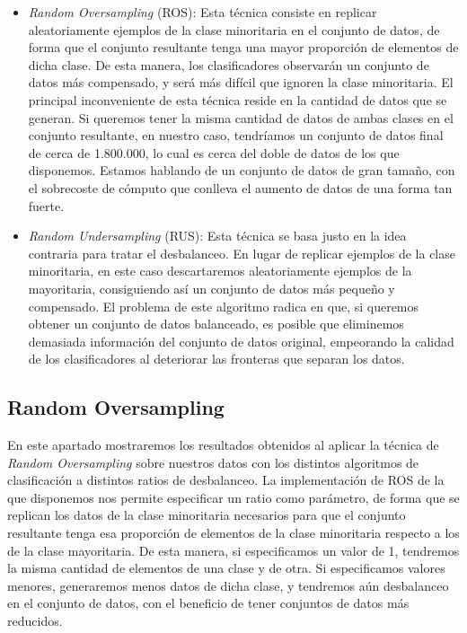 \documentclass[
  a4paper,
,tablecaptionabove
]{scrartcl}
\providecommand{\tightlist}{%
  \setlength{\itemsep}{0pt}\setlength{\parskip}{0pt}}
\begin{document}
\begin{itemize}
\tightlist
\item
  \emph{Random Oversampling} (ROS): Esta técnica consiste en replicar
  aleatoriamente ejemplos de la clase minoritaria en el conjunto de
  datos, de forma que el conjunto resultante tenga una mayor proporción
  de elementos de dicha clase. De esta manera, los clasificadores
  observarán un conjunto de datos más compensado, y será más difícil que
  ignoren la clase minoritaria. El principal inconveniente de esta
  técnica reside en la cantidad de datos que se generan. Si queremos
  tener la misma cantidad de datos de ambas clases en el conjunto
  resultante, en nuestro caso, tendríamos un conjunto de datos final de
  cerca de 1.800.000, lo cual es cerca del doble de datos de los que
  disponemos. Estamos hablando de un conjunto de datos de gran tamaño,
  con el sobrecoste de cómputo que conlleva el aumento de datos de una
  forma tan fuerte.
\item
  \emph{Random Undersampling} (RUS): Esta técnica se basa justo en la
  idea contraria para tratar el desbalanceo. En lugar de replicar
  ejemplos de la clase minoritaria, en este caso descartaremos
  aleatoriamente ejemplos de la mayoritaria, consiguiendo así un
  conjunto de datos más pequeño y compensado. El problema de este
  algoritmo radica en que, si queremos obtener un conjunto de datos
  balanceado, es posible que eliminemos demasiada información del
  conjunto de datos original, empeorando la calidad de los
  clasificadores al deteriorar las fronteras que separan los datos.
\end{itemize}

\hypertarget{random-oversampling}{%
\subsection{Random Oversampling}\label{random-oversampling}}

En este apartado mostraremos los resultados obtenidos al aplicar la
técnica de \emph{Random Oversampling} sobre nuestros datos con los
distintos algoritmos de clasificación a distintos ratios de desbalanceo.
La implementación de ROS de la que disponemos nos permite especificar un
ratio como parámetro, de forma que se replican los datos de la clase
minoritaria necesarios para que el conjunto resultante tenga esa
proporción de elementos de la clase minoritaria respecto a los de la
clase mayoritaria. De esta manera, si especificamos un valor de 1,
tendremos la misma cantidad de elementos de una clase y de otra. Si
especificamos valores menores, generaremos menos datos de dicha clase, y
tendremos aún desbalanceo en el conjunto de datos, con el beneficio de
tener conjuntos de datos más reducidos.
\end{document}
